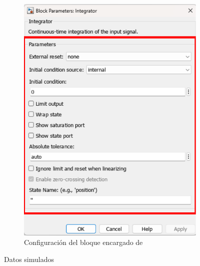 \begin{figure}[htbp]
\begin{subfigure}[b]{0.45\textwidth}
        \includegraphics[width=\textwidth]{fig/Capitulo5/Caso_de_estudio_PID/config_integrator.pdf}
        \caption{Configuración del bloque encargado de }
        \label{fig:oe_sim}
    \end{subfigure}
    \caption{Datos simulados}
    \label{fig:data_simulated}
\end{figure}

